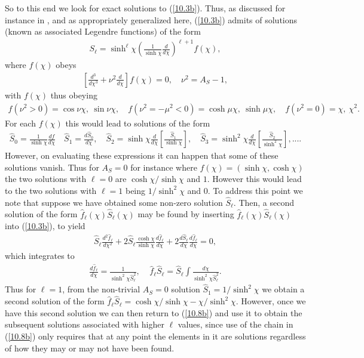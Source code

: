 \documentclass[aps,onecolumn,10pt]{revtex4}
\numberwithin{equation}{section}
\numberwithin{equation}{section}
\begin{document}
So to this end we look for exact solutions to (\ref{10.3b}). Thus,  as discussed for instance in \cite{Bander1966,Mannheim1988}, and as appropriately generalized here,  (\ref{10.3b}) 
admits of solutions (known as associated Legendre functions) of the form 
%
\begin{eqnarray}
S_{\ell}=\sinh^{\ell}\chi\left(\frac{1}{ \sinh\chi} \frac{d }{ d\chi}\right)^{\ell+1}f(\chi),
\label{10.5b}
\end{eqnarray}
%
where $f(\chi)$ obeys
%
\begin{eqnarray}
\left[\frac{d^3}{d\chi^3}+\nu^2\frac{d}{d\chi}\right]f(\chi)=0,\quad \nu^2=A_S-1,
\label{10.6b}
\end{eqnarray}
%
with $f(\chi)$ thus obeying 
%
\begin{eqnarray}
f(\nu^2>0)=\cos\nu\chi,~\sin\nu\chi,\quad f(\nu^2=-\mu^2<0)=\cosh\mu\chi,~\sinh\mu\chi,\quad f(\nu^2=0)=\chi,~\chi^2.
\label{10.7b}
\end{eqnarray}
%
For each $f(\chi)$ this would lead to solutions of the form
%
\begin{eqnarray}
\hat{S}_0=\frac{1}{\sinh\chi}\frac{df}{d\chi}\quad \hat{S}_1=\frac{d\hat{S}_0}{d\chi},\quad \hat{S}_2=\sinh\chi\frac{d}{d\chi}\left[\frac{\hat{S}_1}{\sinh\chi}\right],\quad \hat{S}_3=\sinh^2\chi\frac{d}{d\chi}\left[\frac{\hat{S}_2}{\sinh^2\chi}\right],....
\label{10.8b}
\end{eqnarray}
%
However, on evaluating these expressions it can happen that some of these solutions vanish. Thus for $A_S=0$ for instance where $f(\chi)=(\sinh\chi,\cosh\chi)$ the two solutions with $\ell=0$ are $\cosh\chi/\sinh\chi$ and $1$. However this would lead to the two solutions with $\ell=1$ being $1/\sinh^2\chi$ and $0$. To address this point we note that suppose we have obtained some non-zero solution $\hat{S}_{\ell}$. Then, a second solution of the form $\hat{f}_{\ell}(\chi)\hat{S}_{\ell}(\chi)$ may be found by inserting $\hat{f}_{\ell}(\chi)\hat{S}_{\ell}(\chi)$ into (\ref{10.3b}), to yield
%
\begin{eqnarray}
\hat{S}_{\ell}\frac{d^2 \hat{f}_{\ell}}{ d\chi^2}+2\hat{S}_{\ell}\frac{\cosh\chi }{ \sinh\chi}\frac{d \hat{f}_{\ell}}{ d\chi}+2\frac{d \hat{S}_{\ell}}{ d\chi}\frac{d \hat{f}_{\ell}}{ d\chi}=0,
\label{10.9b}
\end{eqnarray}
%
which integrates to
%
\begin{eqnarray}
\frac{d \hat{f}_{\ell}}{ d\chi}=\frac{1}{\sinh^2\chi\hat{S}_{\ell}^2},~~~~~\hat{f}_{\ell}\hat{S}_{\ell}=\hat{S}_{\ell}\int \frac{d\chi }{\sinh^2\chi\hat{S}_{\ell}^2}.
\label{10.10b}
\end{eqnarray}
%
Thus for $\ell=1$, from the non-trivial $A_S=0$ solution $\hat{S}_{1}=1/\sinh^2\chi$ we obtain a second solution of the form $\hat{f}_{\ell}\hat{S}_{\ell}=\cosh\chi/\sinh\chi-\chi/\sinh^2\chi$. However, once we have this second solution we can then return to (\ref{10.8b}) and use it to obtain the subsequent solutions associated with higher $\ell$ values, since use of the chain in (\ref{10.8b}) only requires that at any point the elements in it are solutions regardless of how they may or may not have been found.
\end{document}

